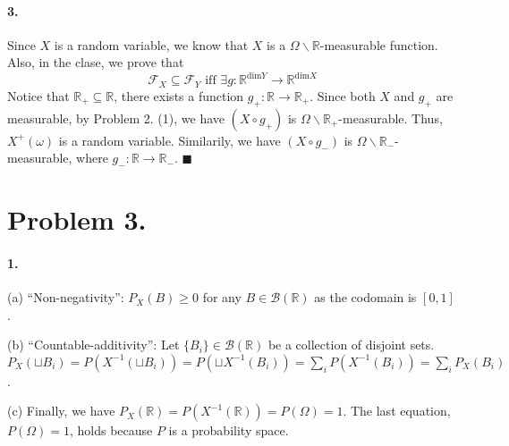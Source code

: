 \documentclass[11pt]{article}
\theoremstyle{definition}
\theoremstyle{boldtitle} %
\numberwithin{equation}{section}
\numberwithin{figure}{section}
\numberwithin{table}{section}
\begin{document}
\paragraph{3.} Since $X$ is a random variable, we know that $X$ is a $\Omega \backslash \mathbb{R}$-measurable function.
Also, in the clase, we prove that 
\[
\mathcal{F}_X \subseteq \mathcal{F}_Y \text{ iff } \exists g: \mathbb{R}^{\text{dim} Y} \rightarrow \mathbb{R}^{\text{dim} X}
\]
Notice that $\mathbb{R}_{+} \subseteq \mathbb{R}$, there exists a function $g_+: \mathbb{R} \rightarrow \mathbb{R}_{+}$.
Since both $X$ and $g_+$ are measurable, by Problem 2. (1), we have $(X \circ g_+)$ is $\Omega \backslash \mathbb{R}_+$-measurable.
Thus, $X^+(\omega)$ is a random variable.
Similarily, we have $(X \circ g_-)$ is $\Omega \backslash \mathbb{R}_-$-measurable, where $g_-: \mathbb{R} \rightarrow \mathbb{R}_-$.
\(\blacksquare\)

\begin{figure}[htbp]
  \centering
\end{figure}

\section*{Problem 3.} 
\paragraph{1.} (a) ``Non-negativity'': $P_X (B) \geq 0$ for any $B \in \mathcal{B}(\mathbb{R})$ as the codomain is $[0,1]$.

(b) ``Countable-additivity'': Let $\{B_i\} \in \mathcal{B}(\mathbb{R})$ be a collection of disjoint sets.
$P_X (\sqcup B_i) = P(X^{-1} (\sqcup B_i) ) = P(\sqcup X^{-1} (B_i) ) = \sum_i P(X^{-1} (B_i) ) = \sum_i P_X(B_i)$.

(c) Finally, we have $P_X (\mathbb{R}) = P(X^{-1} (\mathbb{R})) = P(\Omega) = 1$.
The last equation, $P(\Omega) = 1$, holds because $P$ is a probability space.
\end{document}
